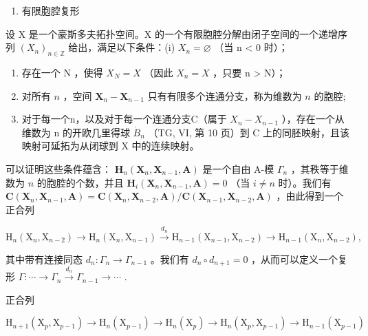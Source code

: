 \begin{enumerate}
\def\labelenumi{\arabic{enumi})}
\setcounter{enumi}{1}
\tightlist
\item
  有限胞腔复形
\end{enumerate}

设 X 是一个豪斯多夫拓扑空间。X 的一个有限胞腔分解由闭子空间的一个递增序列 \((X_{n})_{n\in\mathbb{Z}}\) 给出，满足以下条件：(i) \(X_{n} = \varnothing\) （当 n \textless{} 0 时）；

\begin{enumerate}
\def\labelenumi{(\roman{enumi})}
\setcounter{enumi}{1}
\item
  存在一个 N ，使得 \(X_{N} = X\) （因此 \(X_{n} = X\) ，只要 n \textgreater{} N）；
\item
  对所有 \(n\) ，空间 \(\mathbf{X}_{n} - \mathbf{X}_{n-1}\) 只有有限多个连通分支，称为维数为 \(n\) 的胞腔;
\item
  对于每一个n，以及对于每一个连通分支C（属于 \(X_{n} - X_{n-1}\) ），存在一个从维数为 n 的开欧几里得球 \(\dot{B}_{n}\) （TG, VI, 第 10 页）到 C 上的同胚映射，且该映射可延拓为从闭球到 X 中的连续映射。
\end{enumerate}

可以证明这些条件蕴含： \(\mathbf{H}_n(\mathbf{X}_n, \mathbf{X}_{n-1}, \mathbf{A})\) 是一个自由 A-模 \(\Gamma_n\) ，其秩等于维数为 \(n\) 的胞腔的个数，并且 \(\mathbf{H}_i(\mathbf{X}_n, \mathbf{X}_{n-1}, \mathbf{A}) = 0\) （当 \(i \neq n\) 时）。我们有 \(\mathbf{C}(\mathbf{X}_n, \mathbf{X}_{n-1}, \mathbf{A}) = \mathbf{C}(\mathbf{X}_n, \mathbf{X}_{n-2}, \mathbf{A}) / \mathbf{C}(\mathbf{X}_{n-1}, \mathbf{X}_{n-2}, \mathbf{A})\) ，由此得到一个正合列

\[
\mathrm{H} _ {n} \left(\mathrm{X} _ {n}, \mathrm{X} _ {n - 2}\right) \longrightarrow \mathrm{H} _ {n} \left(\mathrm{X} _ {n}, \mathrm{X} _ {n - 1}\right) \xrightarrow {d _ {n}} \mathrm{H} _ {n - 1} \left(\mathrm{X} _ {n - 1}, \mathrm{X} _ {n - 2}\right) \longrightarrow \mathrm{H} _ {n - 1} \left(\mathrm{X} _ {n}, \mathrm{X} _ {n - 2}\right),
\]

其中带有连接同态 \(d_{n}:\Gamma_{n}\to\Gamma_{n-1}\) 。我们有 \(d_{n}\circ d_{n+1}=0\) ，从而可以定义一个复形 \(\Gamma:\cdots\to\Gamma_{n}\xrightarrow{d_{n}}\Gamma_{n-1}\to\cdots\) .

正合列

\[
\mathrm{H} _ {n + 1} \left(\mathrm{X} _ {p}, \mathrm{X} _ {p - 1}\right)\rightarrow \mathrm{H} _ {n} \left(\mathrm{X} _ {p - 1}\right)\rightarrow \mathrm{H} _ {n} \left(\mathrm{X} _ {p}\right)\rightarrow \mathrm{H} _ {n} \left(\mathrm{X} _ {p}, \mathrm{X} _ {p - 1}\right)\rightarrow \mathrm{H} _ {n - 1} \left(\mathrm{X} _ {p - 1}\right)
\]

